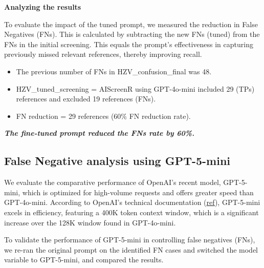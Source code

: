 \documentclass[
  letterpaper,
  DIV=11,
  numbers=noendperiod]{scrartcl}
\newenvironment{Shaded}{\begin{snugshade}}{\end{snugshade}}
\newcommand{\CommentTok}[1]{\textcolor[rgb]{0.37,0.37,0.37}{#1}}
\begin{document}
\textbf{Analyzing the results}

To evaluate the impact of the tuned prompt, we measured the reduction in
False Negatives (FNs). This is calculated by subtracting the new FNs
(tuned) from the FNs in the initial screening. This equals the prompt's
effectiveness in capturing previously missed relevant references,
thereby improving recall.

\begin{Shaded}
\end{Shaded}

\begin{itemize}
\item
  The previous number of FNs in HZV\_confusion\_final was 48.
\item
  HZV\_tuned\_screening = AIScreenR using GPT-4o-mini included 29 (TPs)
  references and excluded 19 references (FNs).
\item
  FN reduction = 29 references (60\% FN reduction rate).
\end{itemize}

\textbf{\emph{The fine-tuned prompt reduced the FNs rate by 60\%.}}

\subsection{False Negative analysis using
GPT-5-mini}\label{false-negative-analysis-using-gpt-5-mini}

We evaluate the comparative performance of OpenAI's recent model,
GPT-5-mini, which is optimized for high-volume requests and offers
greater speed than GPT-4o-mini. According to OpenAI's technical
documentation
(\href{https://developers.openai.com/api/docs/models}{ref}), GPT-5-mini
excels in efficiency, featuring a 400K token context window, which is a
significant increase over the 128K window found in GPT-4o-mini.

To validate the performance of GPT-5-mini in controlling false negatives
(FNs), we re-ran the original prompt on the identified FN cases and
switched the model variable to GPT-5-mini, and compared the results.
\end{document}
